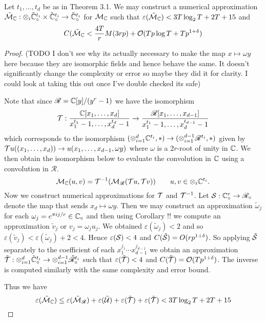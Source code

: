 \begin{proposition}
    Let $t_1, \ldots, t_d$ be as in Theorem 3.1. We may construct a numerical approximation $\tilde{\mathcal M}_{\mathbb C}: \otimes_i \tilde{{\mathbb C}}^{t_i}_\circ \times \tilde{{\mathbb C}}^{t_i}_\circ \to \tilde{{\mathbb C}}^{t_i}_\circ$ for $\mathcal M_{\mathbb C}$ such that $\varepsilon(\tilde{\mathcal M}_{\mathbb C}) < 3 T \log_2 T + 2 T + 15$ and
    \[
        C(\tilde{\mathcal M}_{\mathbb C} < \frac{4T}{r} M(3rp) + \mathcal O(Tp \log T + Tp^{1 + \delta})
    \]
\end{proposition}

\begin{proof}

    (TODO I don't see why its actually necessary to make the map $x \mapsto \omega y$ here because they are isomorphic fields and hence behave the same. It doesn't significantly change the complexity or error so maybe they did it for clarity. I could look at taking this out once I've double checked its safe)

    \medskip

    Note that since $\mathscr{R} = {\mathbb C}[y]/(y^{r} - 1)$ we have the isomorphism
    \[
        \mathcal T: \frac{{\mathbb C}[x_1, \ldots, x_d]}{x_1^{t_1} - 1, \ldots, x_d^{t_d} - 1} \to \frac{\mathscr{R}[x_1, \ldots, x_{d-1}]}{x_1^{t_1} - 1, \ldots, x_d^{t_{d-1}} - 1}
    \]
    which corresponds to the isomorphism $(\otimes_{i=1}^d {\mathbb C}^{t_i}, \ast) \to (\otimes_{i=1}^{d-1} \mathscr{R}^{t_i}, \ast)$ given by $\mathcal Tu((x_1, \ldots, x_d)) \to u(x_1, \ldots, x_{d-1}, \omega y)$ where $\omega$ is a $2r$-root of unity in ${\mathbb C}$. We then obtain the isomorphism below to evaluate the convolution in ${\mathbb C}$ using a convolution in $\mathscr{R}$.
    \[
        \mathcal M_{\mathbb C}(u, v) = \mathcal T^{-1}(\mathcal M_{\mathscr{R}}(\mathcal Tu, \mathcal Tv)) \qquad u, v \in \otimes_i {\mathbb C}^{t_i}.
    \]
    Now we construct numerical approximations for $\mathcal T$ and $\mathcal T^{-1}$. Let $\mathcal S: {\mathbb C}^r_\circ \to \mathscr{R}_\circ$ denote the map that sends $x_d \mapsto \omega y$. Then we may construct an approximation $\tilde{\omega}_j$ for each $\omega_j = e^{\pi i j / r} \in {\mathbb C}_\circ$ and then using Corollary !! we compute an approximation $\tilde{v}_j$ or $v_j = \omega_j u_j$. We obtained $\varepsilon(\tilde{\omega}_j) < 2$ and so $\varepsilon(\tilde{v}_j) < \varepsilon(\tilde{\omega}_j) + 2 < 4$. Hence $\varepsilon(\mathcal S) < 4$ and $C(\tilde{\mathcal S}) = O(r p^{1 + \delta})$. So applying $\tilde{\mathcal S}$ separately to the coefficient of each $x_1^{j_1} \cdots x_{d-1}^{j_{d-1}}$ we obtain an approximation $\tilde{\mathcal T}: \otimes_{i=1}^d \tilde{{\mathbb C}}^{t_i}_\circ \to \otimes^{d-1}_{i=1} \tilde{\mathscr{R}}_\circ^{t_i}$ such that $\varepsilon(\tilde{\mathcal T}) < 4$ and $C(\tilde{\mathcal T}) = \mathcal O(Tp^{1 + \delta})$. The inverse is computed similarly with the same complexity and error bound.

    Thus we have
    \[
        \varepsilon(\tilde{\mathcal M}_{\mathbb C}) \le \varepsilon(\tilde{\mathcal M}_{\mathscr{R}}) + \varepsilon(\tilde{\mathcal U}) + \varepsilon(\tilde{\mathcal T}) + \varepsilon(\tilde{\mathcal T}) < 3T \log_2 T + 2T + 15
    \]
\end{proof}

